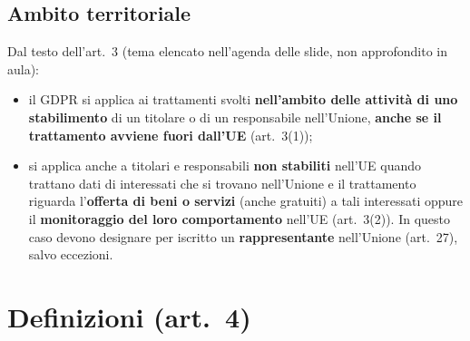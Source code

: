 \subsection{Ambito territoriale}
Dal testo dell'art.~3 (tema elencato nell'agenda delle slide, non approfondito in aula):
\begin{itemize}
  \item il GDPR si applica ai trattamenti svolti \textbf{nell'ambito delle attività di uno stabilimento}
    di un titolare o di un responsabile nell'Unione, \textbf{anche se il trattamento avviene fuori
    dall'UE} (art.~3(1));
  \item si applica anche a titolari e responsabili \textbf{non stabiliti} nell'UE quando trattano dati di
    interessati che si trovano nell'Unione e il trattamento riguarda l'\textbf{offerta di beni o servizi}
    (anche gratuiti) a tali interessati oppure il \textbf{monitoraggio del loro comportamento} nell'UE
    (art.~3(2)). In questo caso devono designare per iscritto un \textbf{rappresentante} nell'Unione
    (art.~27), salvo eccezioni.
\end{itemize}

\section{Definizioni (art.~4)}
\label{sec:gdpr-definizioni}


